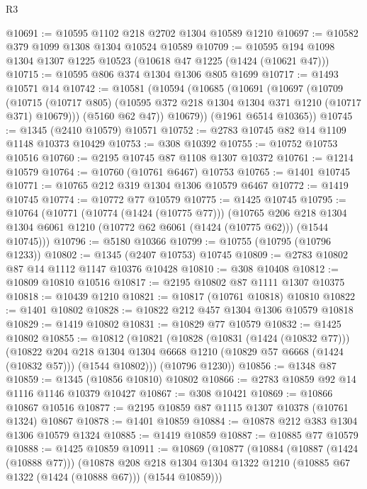 \begin{lexlean}{R3}
\begin{coremodule}
@10691 := @10595 @1102 @218 @2702 @1304 @10589 @1210
@10697 := @10582 @379 @1099 @1308 @1304 @10524 @10589
@10709 := @10595 @194 @1098 @1304 @1307 @1225 @10523 (@10618 @47 @1225 (@1424 (@10621 @47)))
@10715 := @10595 @806 @374 @1304 @1306 @805 @1699
@10717 := @1493 @10571 @14
@10742 := @10581
    (@10594
      (@10685
        (@10691
          (@10697
            (@10709
              (@10715 (@10717 @805) (@10595 @372 @218 @1304 @1304 @371 @1210 (@10717 @371) @10679)))
            (@5160 @62 @47))
          @10679))
      (@1961 @6514 @10365))
@10745 := @1345 (@2410 @10579) @10571
@10752 := @2783 @10745 @82 @14 @1109 @1148 @10373 @10429
@10753 := @308 @10392
@10755 := @10752 @10753 @10516
@10760 := @2195 @10745 @87 @1108 @1307 @10372
@10761 := @1214 @10579
@10764 := @10760 (@10761 @6467) @10753
@10765 := @1401 @10745
@10771 := @10765 @212 @319 @1304 @1306 @10579 @6467
@10772 := @1419 @10745
@10774 := @10772 @77 @10579
@10775 := @1425 @10745
@10795 := @10764
    (@10771
      (@10774 (@1424 (@10775 @77)))
      (@10765
        @206
        @218
        @1304
        @1304
        @6061
        @1210
        (@10772 @62 @6061 (@1424 (@10775 @62)))
        (@1544 @10745)))
@10796 := @5180 @10366
@10799 := @10755 (@10795 (@10796 @1233))
@10802 := @1345 (@2407 @10753) @10745
@10809 := @2783 @10802 @87 @14 @1112 @1147 @10376 @10428
@10810 := @308 @10408
@10812 := @10809 @10810 @10516
@10817 := @2195 @10802 @87 @1111 @1307 @10375
@10818 := @10439 @1210
@10821 := @10817 (@10761 @10818) @10810
@10822 := @1401 @10802
@10828 := @10822 @212 @457 @1304 @1306 @10579 @10818
@10829 := @1419 @10802
@10831 := @10829 @77 @10579
@10832 := @1425 @10802
@10855 := @10812
    (@10821
      (@10828
        (@10831 (@1424 (@10832 @77)))
        (@10822
          @204
          @218
          @1304
          @1304
          @6668
          @1210
          (@10829 @57 @6668 (@1424 (@10832 @57)))
          (@1544 @10802)))
      (@10796 @1230))
@10856 := @1348 @87
@10859 := @1345 (@10856 @10810) @10802
@10866 := @2783 @10859 @92 @14 @1116 @1146 @10379 @10427
@10867 := @308 @10421
@10869 := @10866 @10867 @10516
@10877 := @2195 @10859 @87 @1115 @1307 @10378 (@10761 @1324) @10867
@10878 := @1401 @10859
@10884 := @10878 @212 @383 @1304 @1306 @10579 @1324
@10885 := @1419 @10859
@10887 := @10885 @77 @10579
@10888 := @1425 @10859
@10911 := @10869
    (@10877
      (@10884
        (@10887 (@1424 (@10888 @77)))
        (@10878
          @208
          @218
          @1304
          @1304
          @1322
          @1210
          (@10885 @67 @1322 (@1424 (@10888 @67)))
          (@1544 @10859)))

\end{coremodule}
\end{lexlean}
